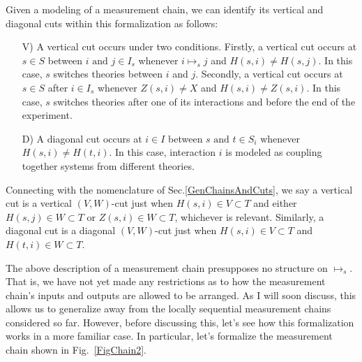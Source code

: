 \documentclass[prd,twocolumn,superscriptaddress,floatfix,amsmath,amssymb,amsfonts,nofootinbib]{revtex4-2}
\begin{document}
Given a modeling of a measurement chain, we can identify its vertical and diagonal cuts within this formalization as follows:
\begin{itemize}
    \item[V)] A vertical cut occurs under two conditions. Firstly, a vertical cut occurs at $s\in S$ between $i\text{ and }j\in I_s$ whenever $i\mapsto_s j$ and \mbox{$H(s,i)\neq H(s,j)$}. In this case, $s$ switches theories between $i$ and $j$. Secondly, a vertical cut occurs at $s\in S$ after $i\in I_s$ whenever $Z(s,i)\neq X$ and \mbox{$H(s,i)\neq Z(s,i)$}. In this case, $s$ switches theories after one of its interactions and before the end of the experiment.
    \item[D)] A diagonal cut occurs at $i\in I$ between $s\text{ and }t\in S_i$ whenever \mbox{$H(s,i)\neq H(t,i)$}. In this case, interaction $i$ is modeled as coupling together systems from different theories.
\end{itemize}
Connecting with the nomenclature of Sec.\ref{GenChainsAndCuts}, we say a vertical cut is a vertical $(V,W)$-cut just when \mbox{$H(s,i)\in V \subset T$} and either \mbox{$H(s,j)\in W \subset T$} or \mbox{$Z(s,i)\in W \subset T$}, whichever is relevant. Similarly, a diagonal cut is a diagonal $(V,W)$-cut just when \mbox{$H(s,i)\in V \subset T$} and \mbox{$H(t,i)\in W \subset T$}.

The above description of a measurement chain presupposes no structure on $\mapsto_s$. That is, we have not yet made any restrictions as to how the measurement chain's inputs and outputs are allowed to be arranged. As I will soon discuss, this allows us to generalize away from the locally sequential measurement chains considered so far. However, before discussing this, let's see how this formalization  works in a more familiar case. In particular, let's formalize the measurement chain shown in Fig.~\ref{FigChain2}.
\end{document}
